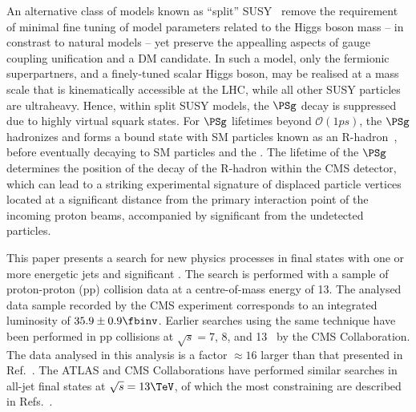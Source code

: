 An alternative class of models known as ``split''
SUSY~\cite{ArkaniHamed:2004fb, Giudice:2004tc} remove the requirement
of minimal fine tuning of model parameters related to the Higgs boson
mass -- in constrast to natural models -- yet preserve the appealling
aspects of gauge coupling unification and a DM candidate. In such a
model, only the fermionic superpartners, and a finely-tuned scalar
Higgs boson, may be realised at a mass scale that is kinematically
accessible at the LHC, while all other SUSY particles are
ultraheavy. Hence, within split SUSY models, the $\PSg$ decay is
suppressed due to highly virtual squark states. For $\PSg$ lifetimes
beyond $\mathcal{O}(1\unit{ps})$, the $\PSg$ hadronizes and forms a
bound state with SM particles known as an
R-hadron~\cite{Fairbairn:2006gg}, before eventually decaying to SM
particles and the \chiz. The lifetime of the $\PSg$ determines the
position of the decay of the R-hadron within the CMS detector, which
can lead to a striking experimental signature of displaced particle
vertices located at a significant distance from the primary
interaction point of the incoming proton beams, accompanied by
significant \ptvecmiss from the undetected \chiz particles.


This paper presents a search for new physics processes in final states
with one or more energetic jets and significant \ptvecmiss. The search
is performed with a sample of proton-proton (pp) collision data at a
centre-of-mass energy of 13\TeV. The analysed data sample recorded by
the CMS experiment corresponds to an integrated luminosity of $35.9
\pm 0.9 \fbinv$. Earlier searches using the same technique have been
performed in pp collisions at $\sqrt{s} = 7$, 8, and
13\TeV~\cite{RA1Paper, RA1Paper2011, RA1Paper2011FULL, RA1Paper2012,
  RA1Parked, Khachatryan:2016dvc} by the CMS Collaboration. The data
analysed in this analysis is a factor ${\approx}16$ larger than that
presented in Ref.~\cite{Khachatryan:2016dvc}. The ATLAS and CMS
Collaborations have performed similar searches in all-jet final states
at $\sqrt{s} = 13\TeV$, of which the most constraining are described
in Refs.~\cite{Aaboud:2016zdn, Sirunyan:2017cwe, Sirunyan:2017kqq}.

